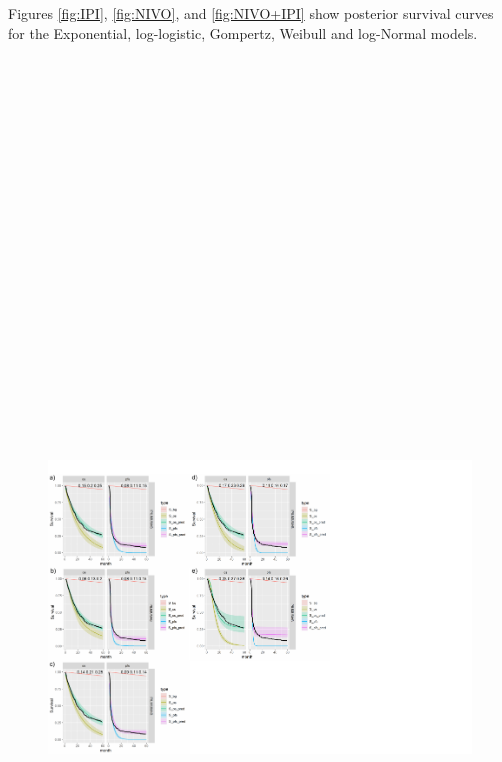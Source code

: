 \documentclass[
]{article}
\begin{document}
Figures \ref{fig:IPI}, \ref{fig:NIVO}, and \ref{fig:NIVO+IPI} show
posterior survival curves for the Exponential, log-logistic, Gompertz,
Weibull and log-Normal models.

\begin{figure}

{\centering \includegraphics[width=25cm,height=40cm]{Check_mate_analysis_files/figure-latex/unnamed-chunk-3-1} 

}
\end{figure}
\end{document}

